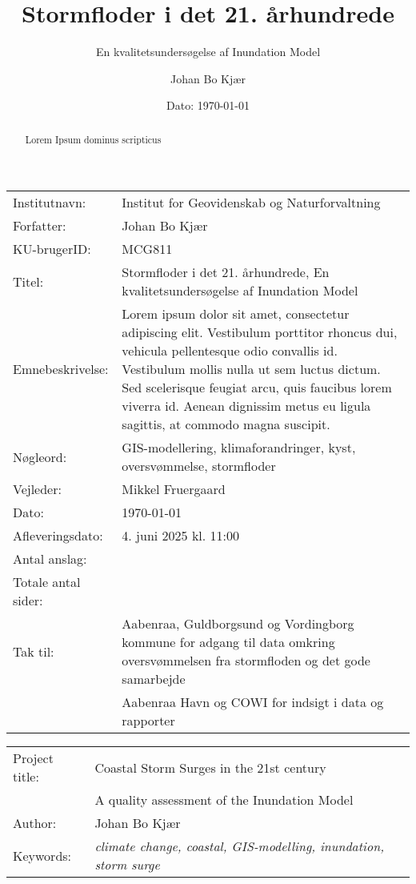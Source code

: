 \documentclass[12pt]{article}
\author{Johan Bo Kjær}
\title{Stormfloder i det 21. århundrede}
\subtitle{En kvalitetsundersøgelse af Inundation Model}
\date{Dato: {\today}}
\begin{document}
\maketitle


\onehalfspacing


\begin{table}[h]
\def\arraystretch{1.5}
\begin{tabularx}{\textwidth}{l X}
Institutnavn: & {Institut for Geovidenskab og Naturforvaltning}  \\
Forfatter: & {Johan Bo Kjær} \\
KU-brugerID: & {MCG811} \\
Titel: & {Stormfloder i det 21. århundrede, En kvalitetsundersøgelse af Inundation Model} \\
Emnebeskrivelse: & Lorem ipsum dolor sit amet, consectetur adipiscing elit. Vestibulum porttitor rhoncus dui, vehicula pellentesque odio convallis id. Vestibulum mollis nulla ut sem luctus dictum. Sed scelerisque feugiat arcu, quis faucibus lorem viverra id. Aenean dignissim metus eu ligula sagittis, at commodo magna suscipit. \\
Nøgleord: & GIS-modellering, klimaforandringer, kyst, oversvømmelse, stormfloder \\
Vejleder: & Mikkel Fruergaard \\
Dato: & \today \\
Afleveringsdato: & 4. juni 2025 kl. 11:00 \\
Antal anslag: &  \\
Totale antal sider: &  \\
Tak til: & Aabenraa, Guldborgsund og Vordingborg kommune for adgang til data omkring oversvømmelsen fra stormfloden og det gode samarbejde\\
& Aabenraa Havn og COWI for indsigt i data og rapporter
\end{tabularx} 
\end{table}

\renewcommand{\contentsname}{Indholdsfortegnelse} %
\renewcommand{\abstractname}{Abstract} %
\renewcommand{\refname}{} %


\newpage
\begin{table}[h]
\def\arraystretch{1.5}
\begin{tabularx}{\textwidth}{l X}
\large{Project title:} & \large{Coastal Storm Surges in the 21st century} \\ & \large{A quality assessment of the Inundation Model} \\
Author: & {Johan Bo Kjær} \\
Keywords: & \textit{climate change, coastal, GIS-modelling, inundation, storm surge}
\end{tabularx}
\end{table}
\begin{abstract}
    Lorem Ipsum dominus scripticus
\end{abstract}
\end{document}
